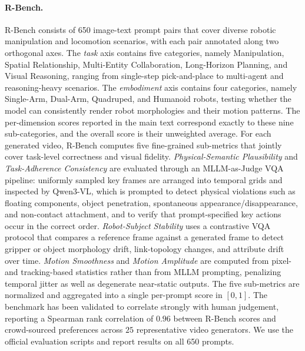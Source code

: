\paragraph{R-Bench.}
R-Bench consists of 650 image-text prompt pairs that cover diverse robotic manipulation and
locomotion scenarios, with each pair annotated along two orthogonal axes. The
\emph{task} axis contains five categories, namely Manipulation, Spatial Relationship,
Multi-Entity Collaboration, Long-Horizon Planning, and Visual Reasoning, ranging from
single-step pick-and-place to multi-agent and reasoning-heavy scenarios. The
\emph{embodiment} axis contains four categories, namely Single-Arm, Dual-Arm, Quadruped,
and Humanoid robots, testing whether the model can consistently render robot morphologies
and their motion patterns. The per-dimension scores reported in the main text correspond
exactly to these nine sub-categories, and the overall score is their unweighted average.
For each generated video, R-Bench computes five fine-grained sub-metrics that jointly
cover task-level correctness and visual fidelity. \emph{Physical-Semantic Plausibility}
and \emph{Task-Adherence Consistency} are evaluated through an MLLM-as-Judge VQA pipeline:
uniformly sampled key frames are arranged into temporal grids and inspected by Qwen3-VL,
which is prompted to detect physical violations such as floating components, object
penetration, spontaneous appearance/disappearance, and non-contact attachment, and to
verify that prompt-specified key actions occur in the correct order. \emph{Robot-Subject
Stability} uses a contrastive VQA protocol that compares a reference frame against a
generated frame to detect gripper or object morphology drift, link-topology changes, and
attribute drift over time. \emph{Motion Smoothness} and \emph{Motion Amplitude} are
computed from pixel- and tracking-based statistics rather than from MLLM prompting,
penalizing temporal jitter as well as degenerate near-static outputs. The five sub-metrics
are normalized and aggregated into a single per-prompt score in $[0, 1]$. The benchmark
has been validated to correlate strongly with human judgement, reporting a Spearman rank
correlation of $0.96$ between R-Bench scores and crowd-sourced preferences across
$25$ representative video generators. We use the official evaluation scripts and report
results on all 650 prompts.

